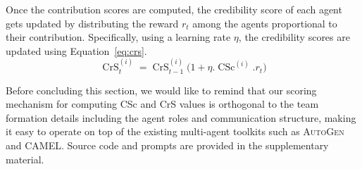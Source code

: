 Once the contribution scores are computed, the credibility score of each agent gets updated by distributing the reward $r_t$ among the agents proportional to their contribution. 
Specifically, using a learning rate $\eta$, the credibility scores are updated using Equation~\ref{eq:crs}.
\begin{equation}
\operatorname{CrS}^{(i)}_{t}=\operatorname{CrS}^{(i)}_{t-1}\bigl(1 + \eta . \operatorname{CSc}^{(i)}.r_t\bigr)
\label{eq:crs}
\end{equation}

Before concluding this section, we would like to remind that our scoring mechanism for computing CSc and CrS values is orthogonal to the team formation details including the agent roles and communication structure, making it easy to operate on top of the existing multi‑agent toolkits such as \textsc{AutoGen} and \textsc{CAMEL}.  Source code and prompts are provided in the supplementary material.